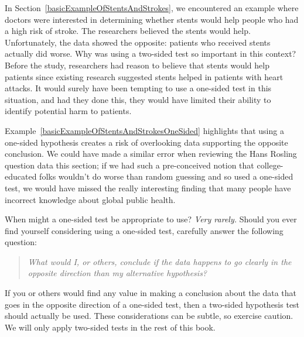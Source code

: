 \begin{example}{
    In Section~\ref{basicExampleOfStentsAndStrokes},
    we encountered an example where doctors were interested
    in determining whether stents would help people who had
    a high risk of stroke.
    The researchers believed the stents would help.
    Unfortunately, the data showed the opposite:
    patients who received stents actually did worse.
    Why was using a two-sided test so important in
    this context?}
    \label{basicExampleOfStentsAndStrokesOneSided}
  Before the study, researchers had reason to believe
  that stents would help patients since existing research
  suggested stents helped in patients with heart attacks.
  It would surely have been tempting to use a one-sided
  test in this situation, and had they done this,
  they would have limited their ability to identify
  potential harm to patients.
\end{example}

Example~\ref{basicExampleOfStentsAndStrokesOneSided}
highlights that using a one-sided hypothesis creates
a risk of overlooking data supporting the opposite
conclusion.
We could have made a similar error when reviewing
the Hans Rosling question data this section;
if we had such a pre-conceived notion that
college-educated folks wouldn't do worse than random
guessing and so used a one-sided test,
we would have missed the really interesting finding
that many people have incorrect knowledge about
global public health.
%    

When might a one-sided test be appropriate to use?
\emph{Very rarely.}
Should you ever find yourself considering using a
one-sided test, carefully answer the following question:
\begin{quote}{\em
  What would I, or others, conclude if the data happens
  to go clearly in the opposite direction than my
  alternative hypothesis?
}\end{quote}
If you or others would find any value in making
a conclusion about the data that goes in the opposite
direction of a one-sided test, then a two-sided hypothesis
test should actually be used.
These considerations can be subtle, so exercise caution.
We will only apply two-sided tests in the rest of
this book. 


